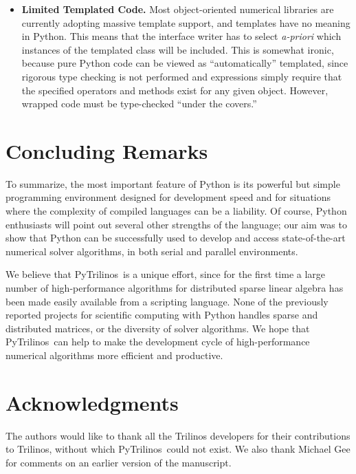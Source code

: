 \documentclass[acmtocl]{acmtrans2m}
\newcommand{\PyTrilinos}{{PyTrilinos}}
\begin{document}
\begin{itemize}
\item {\bf Limited Templated Code.} Most object-oriented numerical
  libraries are currently adopting massive template support, and
  templates have no meaning in Python.  This means that the interface
  writer has to select {\sl a-priori} which instances of the templated
  class will be included.  This is somewhat ironic, because pure
  Python code can be viewed as ``automatically'' templated, since
  rigorous type checking is not performed and expressions simply
  require that the specified operators and methods exist for any given
  object.  However, wrapped code must be type-checked ``under the
  covers.''

\end{itemize}

\section{Concluding Remarks}
\label{sec:concluding}

To summarize, the most important feature of Python is its powerful but
simple programming environment designed for development speed and for
situations where the complexity of compiled languages can be a
liability.  Of course, Python enthusiasts will point out several other
strengths of the language; our aim was to show that Python can be
successfully used to develop and access state-of-the-art numerical
solver algorithms, in both serial and parallel environments.

We believe that \PyTrilinos\ is a unique effort, since for the first
time a large number of high-performance algorithms for distributed
sparse linear algebra has been made easily available from a scripting
language.  None of the previously reported projects for scientific
computing with Python handles sparse and distributed matrices, or the
diversity of solver algorithms.  We hope that \PyTrilinos\ can help to
make the development cycle of high-performance numerical algorithms
more efficient and productive.

\bigskip

\section*{Acknowledgments}
\label{sec:acks}

The authors would like to thank all the Trilinos developers for their
contributions to Trilinos, without which \PyTrilinos\ could not exist.
We also thank Michael Gee for comments on an earlier version of the
manuscript.



\end{document}
